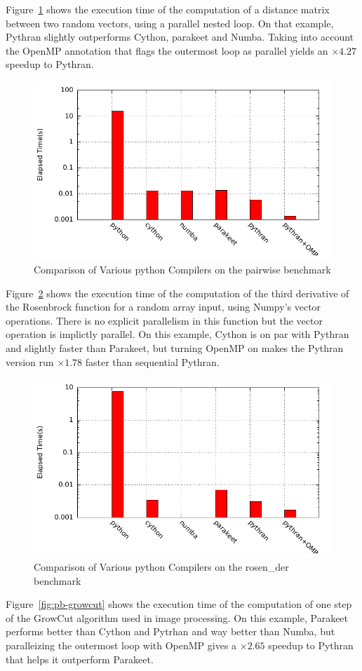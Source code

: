 \documentclass[conference]{IEEEtran}
\begin{document}
Figure~\ref{fig:pb-pairwise} shows the execution time of the computation of a
distance matrix between two random vectors, using a parallel nested loop. On
that example, Pythran slightly outperforms Cython, parakeet and Numba. Taking
into account the OpenMP annotation that flags the outermost loop as parallel
yields an $\times 4.27$ speedup to Pythran.

\begin{figure}[ht]
    \includegraphics[width=.5\textwidth]{pairwise}
    \caption{Comparison of Various python Compilers on the pairwise benchmark}
    \label{fig:pb-pairwise}
\end{figure}

Figure~\ref{fig:pb-rosen} shows the execution time of the computation of the
third derivative of the Rosenbrock function for a random array input, using
Numpy's vector operations. There is no explicit parallelism in this function but
the vector operation is implictly parallel. On this example, Cython is on par
with Pythran and slightly faster than Parakeet, but turning OpenMP on makes the
Pythran version run $\times 1.78$ faster than sequential Pythran.

\begin{figure}[ht]
    \includegraphics[width=.5\textwidth]{rosen_der}
    \caption{Comparison of Various python Compilers on the rosen\_der benchmark}
    \label{fig:pb-rosen}
\end{figure}

Figure~\ref{fig:pb-growcut} shows the execution time of the computation of one
step of the GrowCut algorithm used in image processing. On this example,
Parakeet performs better than Cython and Pytrhan and way better than Numba, but
paralleizing the outermost loop with OpenMP gives a $\times 2.65$ speedup to
Pythran that helps it outperform Parakeet.
\end{document}

